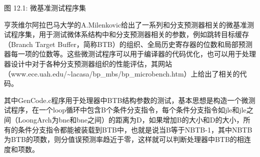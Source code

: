\documentclass[]{ctexbook}
\begin{document}
图 12.1: 微基准测试程序集

亨茨维尔阿拉巴马大学的A.Milenkovic给出了一系列和分支预测器相关的微基准测试程序集，用于测试微体系结构中和分支预测器相关的参数，例如跳转目标缓存（Branch Target Buffer，简称BTB）的组织、全局历史寄存器的位数和局部预测器每一项的位数等。这些微测试程序可以用于编译器的代码优化，也可以用于处理器设计中对于各种分支预测器组织的性能评估，其网站（www.ece.uah.edu/\textasciitilde lacasa/bp\_mbs/bp\_microbench.htm）上给出了相关的代码。

其中GenCode.c程序用于处理器中BTB结构参数的测试，基本思想是构造一个微测试程序，在一个loop循环中包含B个条件分支指令，每个条件分支指令如jle和jle之间（LoongArch为bne和bne之间）的距离为D，如果增加B的大小和D的大小，所有的条件分支指令都能被装载到BTB中，也就是说当B等于NBTB-1，其中NBTB为BTB的项数，则分值误预测率趋近于零，这样就可以判断处理器中BTB的相连度和项数。
\end{document}

